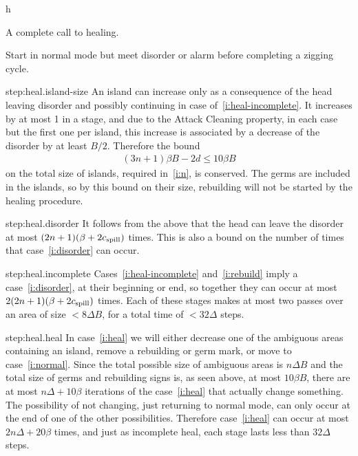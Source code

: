 \documentclass[11pt]{memoir}
\theoremstyle{definition} %
\renewcommand{\le}{\leq}
\def\B{B}
\newcommand{\cns}[1]{c_{\textrm{\upshape #1}}}
\newcommand{\CSpill}{\cns{spill}}
\begin{document}
\begin{Proof}
\begin{prooof}
\begin{varenum}{h}
\item\label{i:heal} A complete call to healing.

\item\label{i:normal}
  Start in normal mode but meet disorder or alarm before completing a zigging cycle.

\end{varenum}

\end{prooof} %

\begin{step+}{step:heal.island-size}
  An island 
  can increase only as a consequence of the head leaving disorder and possibly continuing
  in case of~\eqref{i:heal-incomplete}.
  It increases by at most 1 in a stage, and due to the Attack Cleaning property,
  in each case but the first one per island,
  this increase is associated by a decrease of the disorder by at least \( B/2 \).
  Therefore the bound 
\begin{align*}
 (3n+1)\beta\B - 2d \le 10\beta\B
\end{align*}
on the total size of islands, required in~\eqref{i:n}, is conserved.
  The germs are included in the islands, so by this bound on their size,
  rebuilding will not be started by the healing procedure.
\end{step+}

\begin{step+}{step:heal.disorder}
It follows from the above that
the head can leave the disorder at most \( (2n+1)(\beta + 2\CSpill) \) times.
This is also a bound on the number of times that case~\eqref{i:disorder} can  occur.
\end{step+}

\begin{step+}{step:heal.incomplete}
Cases~\eqref{i:heal-incomplete} and~\eqref{i:rebuild} imply a case~\eqref{i:disorder}, at their
beginning or end, so together they can occur at most \( 2(2n+1)(\beta + 2\CSpill) \) times.
Each of these stages makes at most two passes over an area of size \( <8\Delta\B \),
for a total time of \( < 32\Delta \) steps.
\end{step+}

\begin{step+}{step:heal.heal}
In case~\eqref{i:heal} we will either decrease one of the ambiguous areas containing an island, remove
a rebuilding or germ mark, or move to case~\eqref{i:normal}.
Since the total possible size of ambiguous areas is \( n\Delta\B \) and the total size of germs and rebuilding
signs is, as seen above, at most \( 10\beta\B \), there are at most \( n\Delta + 10\beta \) iterations of the
case~\eqref{i:heal} that actually change something.
The possibility of not changing, just returning to normal mode, can only occur
at the end of one of the other possibilities.
Therefore case~\eqref{i:heal} can occur at most \( 2n\Delta+20\beta \) times,
and just as incomplete heal, each stage lasts less than \( 32\Delta \) steps.
\end{step+}


\end{Proof}
\end{document}
